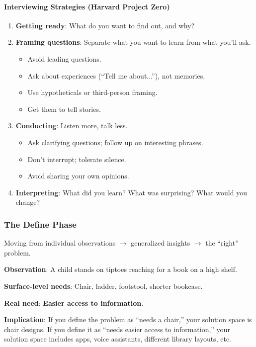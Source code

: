 \paragraph*{Interviewing Strategies (Harvard Project Zero)}

\begin{enumerate}
  \item \textbf{Getting ready}: What do you want to find out, and why?
  \item \textbf{Framing questions}: Separate what you want to learn from what you'll ask.
  \begin{itemize}
    \item Avoid leading questions.
    \item Ask about experiences (``Tell me about...''), not memories.
    \item Use hypotheticals or third-person framing.
    \item Get them to tell stories.
  \end{itemize}
  \item \textbf{Conducting}: Listen more, talk less.
  \begin{itemize}
    \item Ask clarifying questions; follow up on interesting phrases.
    \item Don't interrupt; tolerate silence.
    \item Avoid sharing your own opinions.
  \end{itemize}
  \item \textbf{Interpreting}: What did you learn? What was surprising? What would you change?
\end{enumerate}

\subsubsection*{The Define Phase}

Moving from individual observations $\to$ generalized insights $\to$ the ``right'' problem.

\begin{exbox}
\textbf{Observation}: A child stands on tiptoes reaching for a book on a high shelf.

\textbf{Surface-level needs}: Chair, ladder, footstool, shorter bookcase.

\textbf{Real need}: \textbf{Easier access to information}.

\textbf{Implication}: If you define the problem as ``needs a chair,'' your solution space is chair designs. If you define it as ``needs easier access to information,'' your solution space includes apps, voice assistants, different library layouts, etc.
\end{exbox}

